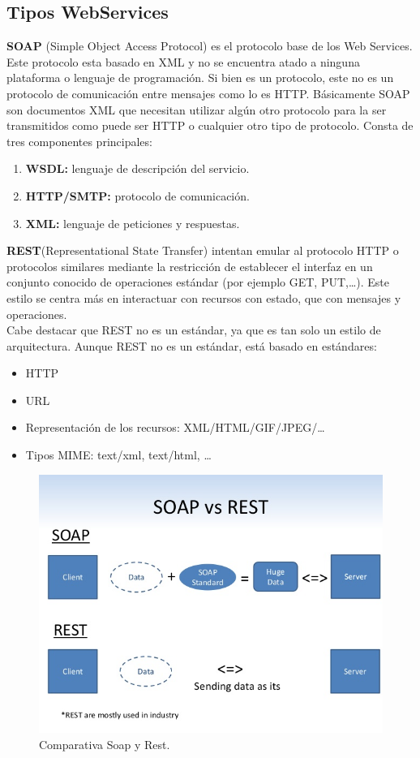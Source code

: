 \subsection*{Tipos WebServices}
\textbf{SOAP} \cite{tipoWebServices} (Simple Object Access Protocol) es el protocolo base de los Web Services. Este protocolo esta basado en XML y no se encuentra atado a ninguna plataforma o lenguaje de programación. Si bien es un protocolo, este no es un protocolo de comunicación entre mensajes como lo es HTTP. Básicamente SOAP son documentos XML que necesitan utilizar algún otro protocolo para la ser transmitidos como puede ser HTTP o cualquier otro tipo de protocolo.
Consta de tres componentes principales:
\begin{enumerate}
  \item \textbf{WSDL:} lenguaje de descripción del servicio.
  \item \textbf{HTTP/SMTP:} protocolo de comunicación.
  \item \textbf{XML: }lenguaje de peticiones y respuestas.
\end{enumerate}
\textbf{REST}(Representational State Transfer) intentan emular al protocolo HTTP o protocolos similares mediante la restricción de establecer el interfaz en un conjunto conocido de operaciones estándar (por ejemplo GET, PUT,…). Este estilo se centra más en interactuar con recursos con estado, que con mensajes y operaciones.  
\\Cabe destacar que REST no es un estándar, ya que es tan solo un estilo de arquitectura.
Aunque REST no es un estándar, está basado en estándares:
\begin{itemize}
\item HTTP
\item URL
\item Representación de los recursos: XML/HTML/GIF/JPEG/…
\item Tipos MIME: text/xml, text/html, … 
\end{itemize}
\begin{figure}[!h]
\begin{center}
   \includegraphics[width=0.5\linewidth]{Figures/Soap_Rest}
  \decoRule
  \caption[Comparativa Soap y Rest]{Comparativa Soap y Rest.}
\label{fig:Soap_Rest}
\end{center}
\end{figure}
